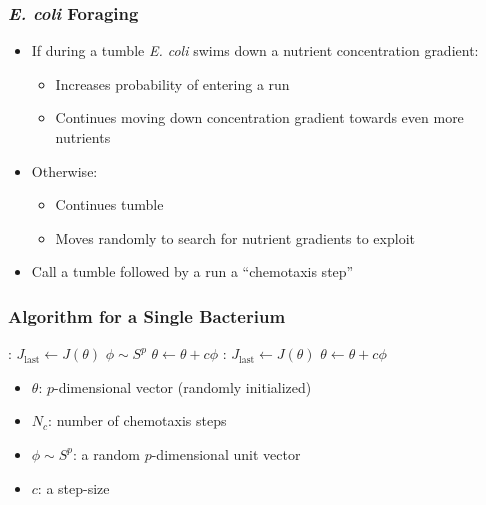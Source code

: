 \documentclass{beamer}
\begin{document}
\begin{frame}
\frametitle{\textit{E. coli} Foraging}
\begin{itemize}
  \item<1-> If during a tumble \textit{E. coli} swims down a nutrient concentration gradient:
  \begin{itemize}
    \item<1-> Increases probability of entering a run
    \item<1-> Continues moving down concentration gradient towards even more nutrients
  \end{itemize}
  \item<2-> Otherwise:
  \begin{itemize}
    \item<2-> Continues tumble
    \item<2-> Moves randomly to search for nutrient gradients to exploit
  \end{itemize}
  \item<3-> Call a tumble followed by a run a ``chemotaxis step''
\end{itemize}
\end{frame}

\begin{frame}
\frametitle{Algorithm for a Single Bacterium}
\begin{algorithmic}[1]
:
  \State $J_\text{last} \gets J(\theta)$
  \State $\phi \sim S^p$
  \State $\theta \gets \theta + c \phi$
  :
    \State $J_\text{last} \gets J(\theta)$
    \State $\theta \gets \theta + c \phi$
  \EndWhile
\EndFor
\end{algorithmic}
\begin{itemize}
  \item $\theta$: $p$-dimensional vector (randomly initialized)
  \item $N_c$: number of chemotaxis steps
  \item $\phi \sim S^p$: a random $p$-dimensional unit vector
  \item $c$: a step-size
\end{itemize}
\end{frame}
\end{document}
